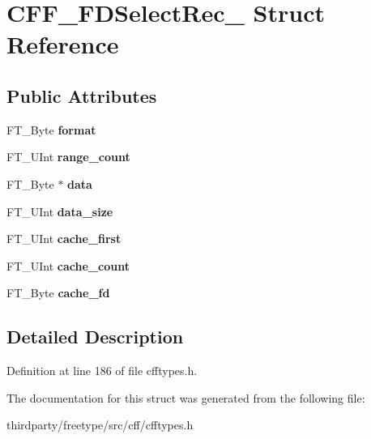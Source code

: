 \hypertarget{struct_c_f_f___f_d_select_rec__}{}\section{C\+F\+F\+\_\+\+F\+D\+Select\+Rec\+\_\+ Struct Reference}
\label{struct_c_f_f___f_d_select_rec__}
\subsection*{Public Attributes}
\begin{DoxyCompactItemize}
\item 
\mbox{\label{struct_c_f_f___f_d_select_rec___a8b5da79a2b66bb2ea860cf9800733d23}} 
F\+T\+\_\+\+Byte {\bfseries format}
\item 
\mbox{\label{struct_c_f_f___f_d_select_rec___a8e4e7b73656c20070ddd16e9d2c099c9}} 
F\+T\+\_\+\+U\+Int {\bfseries range\+\_\+count}
\item 
\mbox{\label{struct_c_f_f___f_d_select_rec___a84397824b8357719949f3ecfac81dbaf}} 
F\+T\+\_\+\+Byte $\ast$ {\bfseries data}
\item 
\mbox{\label{struct_c_f_f___f_d_select_rec___aa7005aad0eb73b0f1b9e23b9ba8aa131}} 
F\+T\+\_\+\+U\+Int {\bfseries data\+\_\+size}
\item 
\mbox{\label{struct_c_f_f___f_d_select_rec___a1dc4bad23f1e0816758fec5ef32c7f7a}} 
F\+T\+\_\+\+U\+Int {\bfseries cache\+\_\+first}
\item 
\mbox{\label{struct_c_f_f___f_d_select_rec___a389b2283045023029ec55463fde85cfa}} 
F\+T\+\_\+\+U\+Int {\bfseries cache\+\_\+count}
\item 
\mbox{\label{struct_c_f_f___f_d_select_rec___a34ac19750608f460047f0b9161fc8ff7}} 
F\+T\+\_\+\+Byte {\bfseries cache\+\_\+fd}
\end{DoxyCompactItemize}


\subsection{Detailed Description}


Definition at line 186 of file cfftypes.\+h.



The documentation for this struct was generated from the following file\+:\begin{DoxyCompactItemize}
\item 
thirdparty/freetype/src/cff/cfftypes.\+h\end{DoxyCompactItemize}
